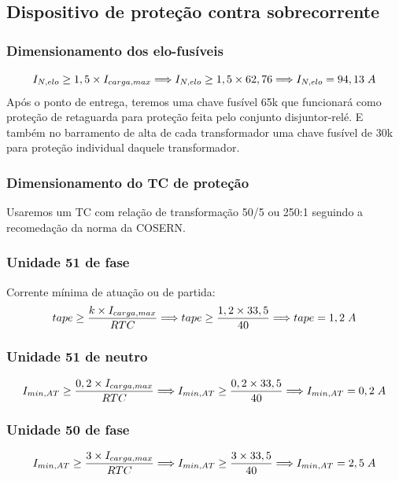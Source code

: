 \subsection{Dispositivo de proteção contra sobrecorrente}
\subsubsection{Dimensionamento dos elo-fusíveis}
\begin{equation*}
{I}_{N,elo} \geq 1,5\times {I}_{carga,max} \Longrightarrow {I}_{N,elo}\geq 1,5\times 62,76 \Longrightarrow {I}_{N,elo}=94,13 \hspace{0.1cm}A
\end{equation*}
Após o ponto de entrega, teremos uma chave fusível 65k que funcionará como proteção de
retaguarda para proteção feita pelo conjunto disjuntor-relé. E também no barramento de alta de cada transformador uma chave fusível de 30k para proteção individual daquele transformador.
\subsubsection{Dimensionamento do TC de proteção}
Usaremos um TC com relação de transformação 50/5 ou 250:1 seguindo a recomedação da norma da COSERN.

\subsubsection{Unidade 51 de fase}
Corrente mínima de atuação ou de partida:
\begin{equation*}
tape \geq \frac{k\times {I}_{carga,max}}{RTC} \Longrightarrow tape \geq \frac{1,2\times 33,5}{40} \Longrightarrow tape=1,2 \hspace{0.1cm}A
\end{equation*}

\subsubsection{Unidade 51 de neutro}
\begin{equation*}
{I}_{min,AT} \geq \frac{0,2\times {I}_{carga,max}}{RTC} \Longrightarrow {I}_{min,AT} \geq \frac{0,2\times 33,5}{40} \Longrightarrow {I}_{min,AT}=0,2 \hspace{0.1cm}A
\end{equation*}

\subsubsection{Unidade 50 de fase}
\begin{equation*}
{I}_{min,AT} \geq \frac{3\times {I}_{carga,max}}{RTC} \Longrightarrow {I}_{min,AT} \geq \frac{3\times 33,5}{40} \Longrightarrow {I}_{min,AT}=2,5 \hspace{0.1cm}A
\end{equation*}

